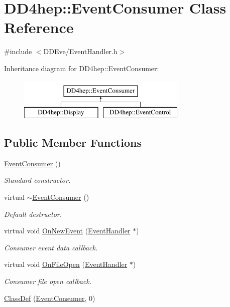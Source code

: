 \hypertarget{class_d_d4hep_1_1_event_consumer}{}\section{D\+D4hep\+:\+:Event\+Consumer Class Reference}
\label{class_d_d4hep_1_1_event_consumer}


{\ttfamily \#include $<$D\+D\+Eve/\+Event\+Handler.\+h$>$}

Inheritance diagram for D\+D4hep\+:\+:Event\+Consumer\+:\begin{figure}[H]
\begin{center}
\leavevmode
\includegraphics[height=2.000000cm]{class_d_d4hep_1_1_event_consumer}
\end{center}
\end{figure}
\subsection*{Public Member Functions}
\begin{DoxyCompactItemize}
\item 
\hyperlink{class_d_d4hep_1_1_event_consumer_a6d0402e70c6479da0fc45e0dee5d050d}{Event\+Consumer} ()
\begin{DoxyCompactList}\small\item\em Standard constructor. \end{DoxyCompactList}\item 
virtual \hyperlink{class_d_d4hep_1_1_event_consumer_aa78ac766120d4cbe9e92dc18af5111c8}{$\sim$\+Event\+Consumer} ()
\begin{DoxyCompactList}\small\item\em Default destructor. \end{DoxyCompactList}\item 
virtual void \hyperlink{class_d_d4hep_1_1_event_consumer_a755b12d11f8676c4f2957f6a1f26fb31}{On\+New\+Event} (\hyperlink{class_d_d4hep_1_1_event_handler}{Event\+Handler} $\ast$)
\begin{DoxyCompactList}\small\item\em Consumer event data callback. \end{DoxyCompactList}\item 
virtual void \hyperlink{class_d_d4hep_1_1_event_consumer_a0a1c56dd7a70e28812fb68c9144ef2fa}{On\+File\+Open} (\hyperlink{class_d_d4hep_1_1_event_handler}{Event\+Handler} $\ast$)
\begin{DoxyCompactList}\small\item\em Consumer file open callback. \end{DoxyCompactList}\item 
\hyperlink{class_d_d4hep_1_1_event_consumer_a659e7fffc8eb8674af560b124f2a648d}{Class\+Def} (\hyperlink{class_d_d4hep_1_1_event_consumer}{Event\+Consumer}, 0)
\end{DoxyCompactItemize}


